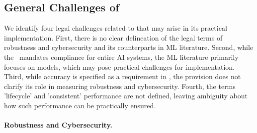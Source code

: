 
\subsection{General Challenges of }\label{sec:general_challenges}

We identify four legal challenges related to  that may arise in its practical implementation.
 First, there is no clear delineation of the legal terms of robustness and cybersecurity and its counterparts in ML literature.
%
 Second, while the \EUAIAct\ mandates compliance for entire AI systems, the ML literature primarily focuses on models, which may pose practical challenges for implementation. 
%
Third, while accuracy is specified as a requirement in , the provision does not clarify its role in measuring robustness and cybersecurity.
% 
Fourth, the terms 'lifecycle' and 'consistent' performance are not defined, leaving ambiguity about how such performance can be practically ensured.
 


\paragraph{Robustness and Cybersecurity.}

